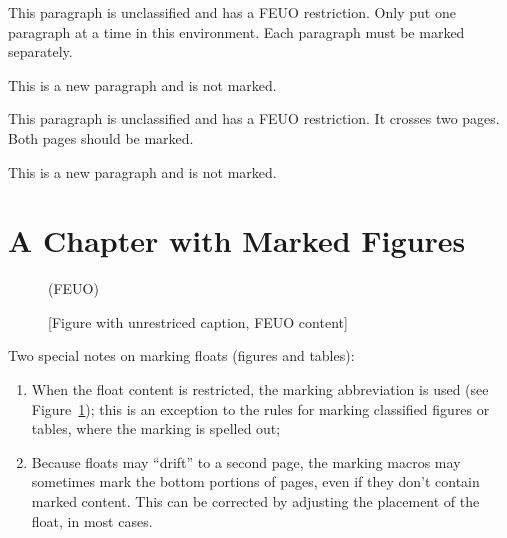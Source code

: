 \begin{smark}[(FEUO)]
This paragraph is unclassified and has a FEUO restriction.
Only put one paragraph at a time in this environment.
Each paragraph must be marked separately.
\lipsum[2]
\end{smark}

This is a new paragraph and is not marked.
\lipsum[3]

\newpage
\lipsum[1-3]

\begin{smark}[(FEUO)]
This paragraph is unclassified and has a FEUO restriction.
It crosses two pages. Both pages should be marked.
\lipsum[4]
\end{smark}

This is a new paragraph and is not marked.
\lipsum[3]

\newpage
\section{A Chapter with Marked Figures}
\lipsum[1-4]

\begin{figure}
\begin{smarkenv}{(FEUO)}
\framebox[\textwidth]{\parbox{\textwidth}{\lipsum[1]}}
\end{smarkenv}
\caption{[Figure with unrestriced caption, FEUO content]}\label{fig:mark}
\end{figure}

Two special notes on marking floats (figures and tables):
\begin{enumerate}
\item When the float content is restricted, the marking abbreviation is
used (see Figure~\ref{fig:mark}); this is an exception
to the rules for marking classified figures or tables, where the
marking is spelled out;
\item Because floats may ``drift'' to a second
page, the marking macros may sometimes mark the bottom portions
of pages, even if they don't contain marked content. This can
be corrected by adjusting the placement of the float, in most
cases.
\end{enumerate}
